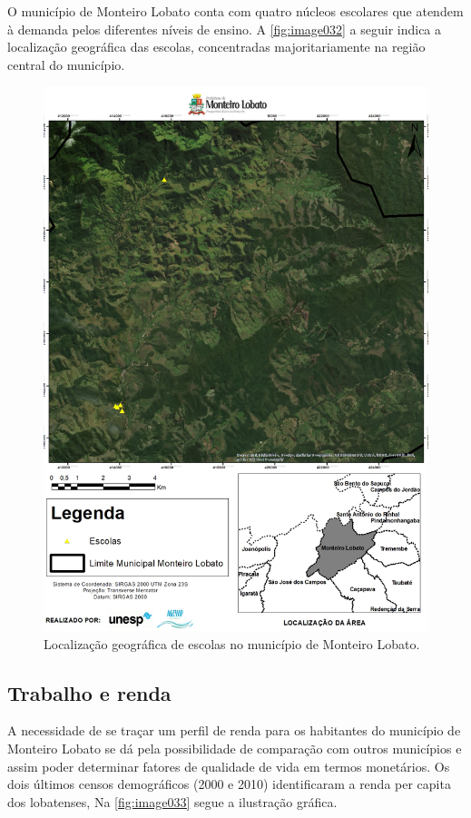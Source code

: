 O município de Monteiro Lobato conta com quatro núcleos escolares que atendem à demanda pelos diferentes níveis de ensino. A \autoref{fig:image032} a seguir indica a localização geográfica das escolas, concentradas majoritariamente na região central do município. 
\newpage
\begin{figure}[h!]
 	\centering
 	\includegraphics[width=1\linewidth]{produtos/proddois/image032}
 	\caption{Localização geográfica de escolas no município de Monteiro Lobato.}
 	\label{fig:image032}
 \end{figure}
\clearpage
\subsection{Trabalho e renda}

A necessidade de se traçar um perfil de renda para os habitantes do município de Monteiro Lobato se dá pela possibilidade de comparação com outros municípios e assim poder determinar fatores de qualidade de vida em termos monetários. Os dois últimos censos demográficos (2000 e 2010) identificaram a renda per capita dos lobatenses, Na \autoref{fig:image033} segue a ilustração gráfica.

